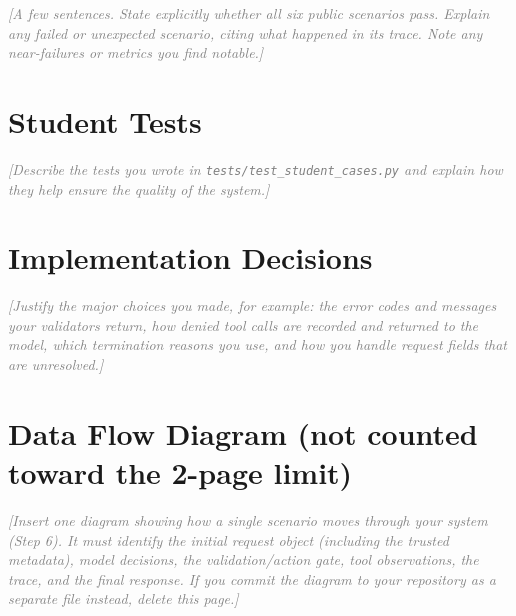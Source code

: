 \documentclass[11pt,letterpaper]{article}
\newcommand{\guide}[1]{\textcolor{gray}{\itshape[#1]}}
\begin{document}
\guide{A few sentences. State explicitly whether all six public scenarios pass. Explain any
failed or unexpected scenario, citing what happened in its trace. Note any near-failures or
metrics you find notable.}

\section{Student Tests}
\guide{Describe the tests you wrote in \texttt{tests/test\_student\_cases.py} and explain how
they help ensure the quality of the system.}

\section{Implementation Decisions}
\guide{Justify the major choices you made, for example: the error codes and messages your
validators return, how denied tool calls are recorded and returned to the model, which
termination reasons you use, and how you handle request fields that are unresolved.}

\clearpage
\section*{Data Flow Diagram (not counted toward the 2-page limit)}
\guide{Insert one diagram showing how a single scenario moves through your system (Step 6). It
must identify the initial request object (including the trusted metadata), model decisions, the
validation/action gate, tool observations, the trace, and the final response. If you commit the
diagram to your repository as a separate file instead, delete this page.}

\begin{center}
  \fbox{\parbox[c][4.5in][c]{0.95\linewidth}{\centering\guide{Insert your data flow diagram here}}}
\end{center}
\end{document}

